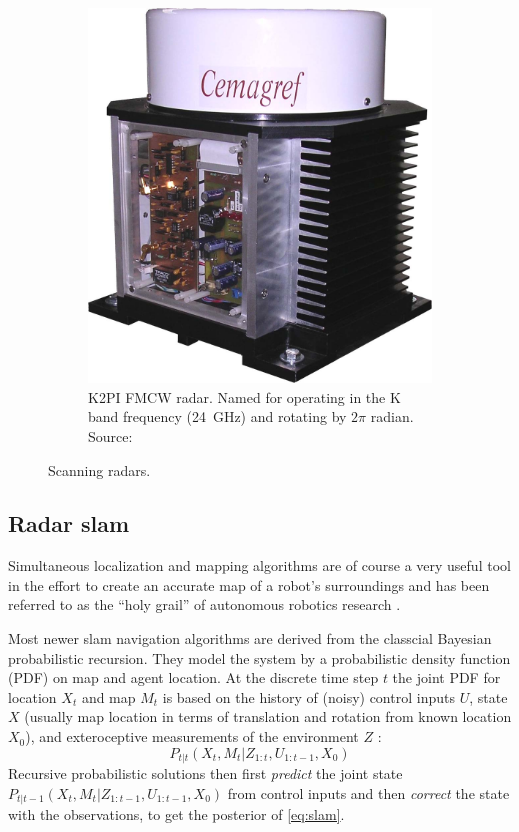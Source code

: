 \begin{figure}[htbp]
\begin{subfigure}[t]{0.3\textwidth}
        \includegraphics[max width=\linewidth]{gfx/pictures/k2pi}
        \caption{K2PI FMCW radar. Named for operating in the K band frequency (\SI{24}{GHz}) and rotating by $2\pi$ radian. Source: \cite{Rouveure2008}}
        \label{fig:k2pi}
    \end{subfigure}
    \caption{Scanning radars.}
\end{figure}


\subsection{Radar slam}\label{radar-slam}


Simultaneous localization and mapping algorithms are of course a very useful tool in the effort to create an accurate map of a robot's surroundings and has been referred to as the ``holy grail'' of autonomous robotics research \cite{Dissanayake2001}.

Most newer slam navigation algorithms are derived from the classcial Bayesian probabilistic recursion. They model the system by a probabilistic density function (PDF) on map and agent location. At the discrete time step $t$ the joint PDF for location $X_t$ and map $M_t$ is based on the history of (noisy) control inputs $U$, state $X$ (usually map location in terms of translation and rotation from known location $X_0$), and exteroceptive measurements of the environment $Z$ \cite{Adams2012}:
\begin{equation} \label{eq:slam}
    P_{t|t}(X_t,M_t|Z_{1:t},U_{1:t-1},X_0)
\end{equation}
Recursive probabilistic solutions then first \textit{predict} the joint state \( P_{t|t-1}(X_t,M_t|Z_{1:t-1},U_{1:t-1},X_0) \) from control inputs and then \textit{correct} the state with the observations, to get the posterior of \cref{eq:slam}.

